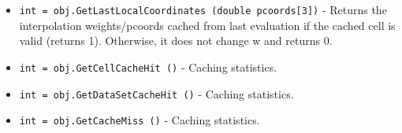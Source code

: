 \begin{itemize}
\item  \verb|int = obj.GetLastLocalCoordinates (double pcoords[3])| -  Returns the interpolation weights/pcoords cached from last evaluation
 if the cached cell is valid (returns 1). Otherwise, it does not
 change w and returns 0.

\item  \verb|int = obj.GetCellCacheHit ()| -  Caching statistics.

\item  \verb|int = obj.GetDataSetCacheHit ()| -  Caching statistics.

\item  \verb|int = obj.GetCacheMiss ()| -  Caching statistics.

\end{itemize}
